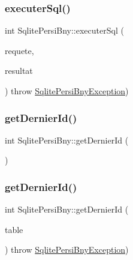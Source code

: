 \mbox{\label{classSqlitePersiBny_aaca09292fb3eb5e7bbf176c86964ff73}} 
\subsubsection{\texorpdfstring{executer\+Sql()}{executerSql()}\hspace{0.1cm}{\footnotesize\ttfamily [2/2]}}
{\footnotesize\ttfamily int Sqlite\+Persi\+Bny\+::executer\+Sql (\begin{DoxyParamCaption}\item[{std\+::string}]{requete,  }\item[{\hyperlink{classSqlitePersiBny_a04bdd1bacd9241210ea44ec2c072f79b}{Sqlite\+Persi\+Bny\+::\+Resultat} \&}]{resultat }\end{DoxyParamCaption}) throw  \hyperlink{classSqlitePersiBnyException}{Sqlite\+Persi\+Bny\+Exception}) }

\mbox{\label{classSqlitePersiBny_a44284ce3b32df4a0f2c0f053323cc4b9}} 
\subsubsection{\texorpdfstring{get\+Dernier\+Id()}{getDernierId()}\hspace{0.1cm}{\footnotesize\ttfamily [1/2]}}
{\footnotesize\ttfamily int Sqlite\+Persi\+Bny\+::get\+Dernier\+Id (\begin{DoxyParamCaption}{ }\end{DoxyParamCaption})}

\mbox{\label{classSqlitePersiBny_a3f6a2b7a50d826cc030ac60aadf54d8f}} 
\subsubsection{\texorpdfstring{get\+Dernier\+Id()}{getDernierId()}\hspace{0.1cm}{\footnotesize\ttfamily [2/2]}}
{\footnotesize\ttfamily int Sqlite\+Persi\+Bny\+::get\+Dernier\+Id (\begin{DoxyParamCaption}\item[{std\+::string}]{table }\end{DoxyParamCaption}) throw  \hyperlink{classSqlitePersiBnyException}{Sqlite\+Persi\+Bny\+Exception}) }



